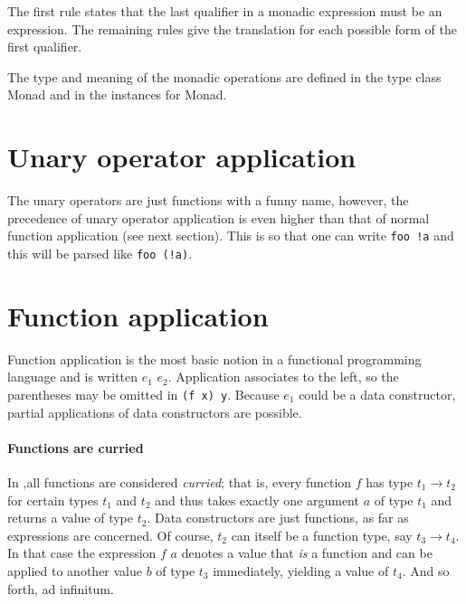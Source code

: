 The first rule states that the last qualifier in a monadic expression must be an expression.
The remaining rules give the translation for each possible form of the first qualifier.

The type and meaning of the monadic operations are defined in the type class Monad and in the instances for Monad.


\section{Unary operator application}

\begin{flushleft}
 
   \alt {} 
\end{flushleft}

The unary operators are just functions with a funny name, however, the precedence of unary operator application is even higher than that of normal function application (see next section). This is so that one can write \texttt{foo !a} and this will be parsed like \texttt{foo (!a)}.


\section{Function application}  \label{funapp} 

\begin{flushleft}
  \alt {} 
\end{flushleft}

Function application is the most basic notion in a functional programming language and is written $e_1$ $e_2$.
Application associates to the left, so the parentheses may be omitted in \texttt{(f x) y}.
Because $e_1$ could be a data constructor, partial applications of data constructors are possible.


\paragraph*{Functions are curried}

In \frege{},all functions are considered \emph{curried}; that is, every function $f$ has type $t_1 \rightarrow{} t_2$ for certain types $t_1$ and $t_2$ and thus takes exactly one argument $a$ of type $t_1$ and returns a value of type $t_2$.
Data constructors are just functions, as far as expressions are concerned.
Of course, $t_2$ can itself be a function type, say $t_3 \rightarrow{} t_4$.
In that case the expression $f$ $a$ denotes a value that \emph{is} a function and can be applied to another value $b$ of type $t_3$ immediately, yielding a value of $t_4$. And so forth, ad infinitum.

